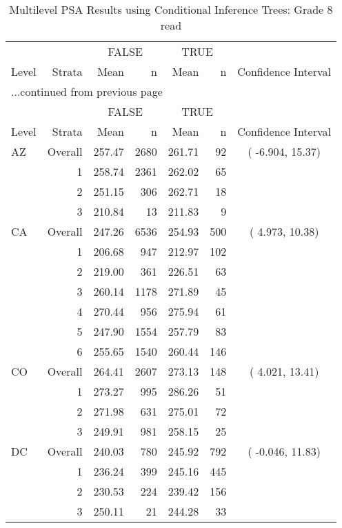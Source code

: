 \begin{longtable}{lrrr@{\extracolsep{.25cm}}rrc}
\caption{Multilevel PSA Results using Conditional Inference Trees: Grade 8 read} \\ 
   \hline & & \multicolumn{2}{c}{FALSE} & \multicolumn{2}{c}{TRUE} & \\ \cline{3-4} \cline{5-6} Level & Strata & Mean & n & Mean & n & Confidence Interval \\ \hline\endfirsthead \multicolumn{7}{l}{{...continued from previous page}}\\ \hline  & & \multicolumn{2}{c}{FALSE} & \multicolumn{2}{c}{TRUE} & \\ \cline{3-4} \cline{5-6} Level & Strata & Mean & n & Mean & n & Confidence Interval \\ \hline \endhead \endfoot \endlastfoot  \hline
AZ & Overall & 257.47 & 2680 & 261.71 &  92 & ( -6.904, 15.37) \\ 
   & 1 & 258.74 & 2361 & 262.02 &  65 &  \\ 
   & 2 & 251.15 & 306 & 262.71 &  18 &  \\ 
   & 3 & 210.84 &  13 & 211.83 &   9 &  \\ 
   \hline
CA & Overall & 247.26 & 6536 & 254.93 & 500 & (  4.973, 10.38) \\ 
   & 1 & 206.68 & 947 & 212.97 & 102 &  \\ 
   & 2 & 219.00 & 361 & 226.51 &  63 &  \\ 
   & 3 & 260.14 & 1178 & 271.89 &  45 &  \\ 
   & 4 & 270.44 & 956 & 275.94 &  61 &  \\ 
   & 5 & 247.90 & 1554 & 257.79 &  83 &  \\ 
   & 6 & 255.65 & 1540 & 260.44 & 146 &  \\ 
   \hline
CO & Overall & 264.41 & 2607 & 273.13 & 148 & (  4.021, 13.41) \\ 
   & 1 & 273.27 & 995 & 286.26 &  51 &  \\ 
   & 2 & 271.98 & 631 & 275.01 &  72 &  \\ 
   & 3 & 249.91 & 981 & 258.15 &  25 &  \\ 
   \hline
DC & Overall & 240.03 & 780 & 245.92 & 792 & ( -0.046, 11.83) \\ 
   & 1 & 236.24 & 399 & 245.16 & 445 &  \\ 
   & 2 & 230.53 & 224 & 239.42 & 156 &  \\ 
   & 3 & 250.11 &  21 & 244.28 &  33 &  \\ 

\end{longtable}
